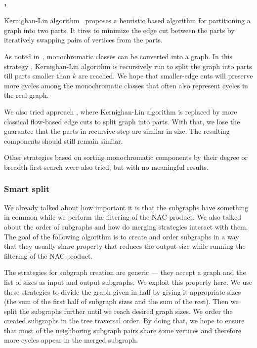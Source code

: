 
\subsubsection{\KernighanLin{}, \Cuts{}}

Kernighan-Lin algorithm~\cite{kernighan_lin} proposes a heuristic based algorithm
for partitioning a graph into two parts. It tires to minimize the edge cut between
the parts by iteratively swapping pairs of vertices from the parts.

As noted in~,
monochromatic classes can be converted into a graph.
In this strategy \KernighanLin{},
Kernighan-Lin algorithm is recursively run to split the graph into parts till
parts smaller than \( k \) are reached.
We hope that smaller-edge cuts will preserve more cycles among
the monochromatic classes that often also represent cycles in the real graph.

We also tried approach \Cuts{}, where Kernighan-Lin algorithm is replaced by
more classical flow-based edge cuts to split graph into parts.
With that, we lose the guarantee that the parts in recursive step
are similar in size. The resulting components should still remain similar.

Other strategies based on
sorting monochromatic components by their degree
or breadth-first-search were also tried,
but with no meaningful results.

\subsubsection{Smart split}%
\label{sec:smart_split}

We already talked about how important it is that the subgraphs have something in common
while we perform the filtering of the NAC-product. We also talked about the order of
subgraphs and how do merging strategies interact with them.
The goal of the following algorithm is to create and order subgraphs in a way that they usually
share property that reduces the output size while running
the filtering of the NAC-product.

The strategies for subgraph creation are generic --- they accept a graph and
the list of sizes as input and output subgraphs. We exploit this property here. We use
these strategies to divide the graph given in half by giving it appropriate
sizes (the sum of the first half of subgraph sizes and the sum of the rest).
Then we split the subgraphs further until we reach desired graph sizes.
We order the created subgraphs in the tree traversal order.
By doing that, we hope to ensure that most of the neighboring subgraph pairs share
some vertices and therefore more cycles appear in the merged subgraph.

